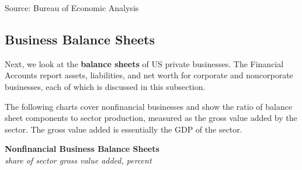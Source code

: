\documentclass{report}
\newcommand{\tbllink}[1]{\href{https://raw.githubusercontent.com/bdecon/US-chartbook/master/chartbook/data/#1}{\faTable}}
\begin{document}
{\begin{minipage}{0.76\textwidth}
\footnotesize{Source: Bureau of Economic Analysis} \hfill \tbllink{cprof2.csv}
\end{minipage}
\newpage
\vspace*{-10mm}

\hypertarget{busbs}{\label{busbs}}
\begin{minipage}{0.76\textwidth}      
\subsection*{Business Balance Sheets}

\small Next, we look at the \textbf{balance sheets} of US private businesses. The Financial Accounts report assets, liabilities, and net worth for corporate and noncorporate businesses, each of which is discussed in this subsection. 

The following charts cover nonfinancial businesses and show the ratio of balance sheet components to sector production, measured as the gross value added by the sector. The gross value added is essentially the GDP of the sector. 
\vspace{1mm}

\normalsize \textbf{Nonfinancial Business Balance Sheets}\\
\footnotesize{\textit{share of sector gross value added, percent}}
\end{minipage}
\vspace{2.8cm}

}
\end{document}
